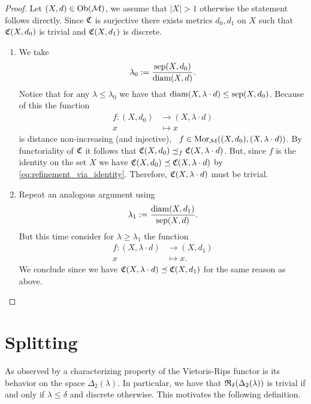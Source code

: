 \begin{proof}
    Let $(X,d) \in \mathrm {Ob}(\mathcal{M})$, we assume that $|X| > 1$ otherwise the statement follows directly. Since $\mathfrak{C}$ is surjective there exists metrics $d_0, d_1$ on $X$ such that $\mathfrak{C}(X,d_0)$ is trivial and $\mathfrak{C}(X,d_1)$ is discrete.

    \begin{enumerate}
        \item We take
        $$
        \lambda_0 := \frac{\mathrm{sep}(X,d_0)}{\mathrm{diam}(X,d)}.
        $$ 
        Notice that for any $\lambda \le \lambda_0$ we have that $\mathrm{diam}(X,\lambda \cdot d) \le \mathrm{sep}(X,d_0)$. Because of this the function
        \begin{align*}
            f: (X, d_0) &\longrightarrow (X, \lambda \cdot d)\\
            x &\longmapsto x
        \end{align*}
        is distance non-increasing (and injective), \ie\ $f \in \mathrm {Mor}_{\mathcal{M}}((X,d_0), (X,\lambda \cdot d))$.
        By functoriality of $\mathfrak{C}$ it follows that $\mathfrak{C}(X,d_0) \preceq_f \mathfrak{C}(X,\lambda \cdot d)$. But, since $f$ is the identity on the set $X$ we have $\mathfrak{C}(X,d_0) \preceq \mathfrak{C}(X,\lambda \cdot d)$ by \eqref{eq:refinement_via_identity}. Therefore, $\mathfrak{C}(X,\lambda \cdot d)$ must be trivial.

        \item Repeat an analogous argument using
        $$
        \lambda_1 := \frac{\mathrm{diam}(X,d_1)}{\mathrm{sep}(X,d)}.
        $$
        But this time consider for $\lambda \ge \lambda_1$ the function
        \begin{align*}
            f: (X, \lambda \cdot d) &\longrightarrow (X, d_1)\\
            x &\longmapsto x.
        \end{align*}
        We conclude since we have $\mathfrak{C}(X,\lambda \cdot d) \preceq \mathfrak{C}(X,d_1)$ for the same reason as above. 
        
    \end{enumerate}
\end{proof}

\section{Splitting}

As observed by \cite[Thm.~6.4]{Carlsson2010} a characterizing property of the Vietoris-Rips functor is its behavior on the space $\Delta_2(\lambda)$. In particular, we have that $\mathfrak{R}_\delta(\Delta_2(\lambda))$ is trivial if and only if $\lambda \le \delta$ and discrete otherwise.
This motivates the following definition.

